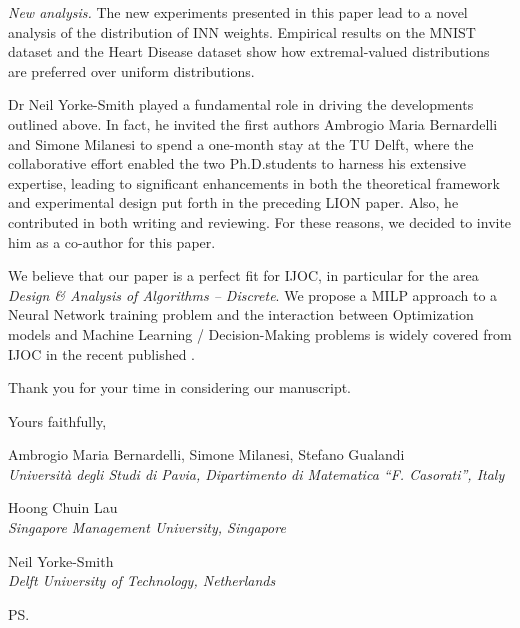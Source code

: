 \documentclass{letter}
\begin{document}
\begin{letter}{}
\textit{New analysis.}
The new experiments presented in this paper lead to a novel analysis of the distribution of INN weights. Empirical results on the MNIST dataset and the Heart Disease dataset show how extremal-valued distributions are preferred over uniform distributions.
%

\medskip
Dr Neil Yorke-Smith played a fundamental role in driving the developments outlined above. In fact, he invited the first authors Ambrogio Maria Bernardelli and Simone Milanesi to spend a one-month stay at the TU Delft, where the collaborative effort enabled the two Ph.D.\@ students to harness his extensive expertise, leading to significant enhancements in both the theoretical framework and experimental design put forth in the preceding LION paper. Also, he contributed in both writing and reviewing. For these reasons, we decided to invite him as a co-author for this paper.

We believe that our paper is a perfect fit for IJOC, in particular for the area \emph{Design \& Analysis of Algorithms -- Discrete}.
%
We propose a MILP approach to a Neural Network training problem and the interaction between Optimization
 models and Machine Learning / Decision-Making problems is widely covered from IJOC in the recent published 
  \cite{janos, mistry, wang}.

Thank you for your time in considering our manuscript.
\bigskip

Yours faithfully,

\begin{flushright}
Ambrogio Maria Bernardelli, Simone Milanesi, Stefano Gualandi\\\textit{Universit\`a degli Studi di Pavia, Dipartimento di Matematica ``F. Casorati'', Italy}

Hoong Chuin Lau\\\textit{Singapore Management University, Singapore}

Neil Yorke-Smith\\\textit{Delft University of Technology, Netherlands}
\end{flushright}


\ps
\vspace{2cm}



\thispagestyle{empty}
\end{letter}
\end{document}
